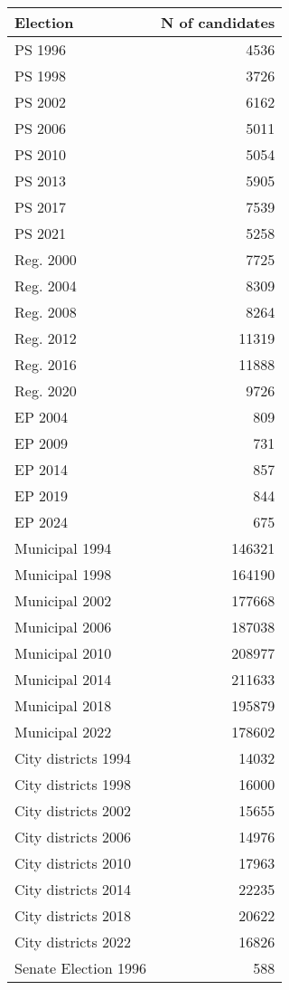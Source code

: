 
\begin{tabular}{l|r}
\hline
Election & N of candidates\\
\hline
PS 1996 & 4536\\
\hline
PS 1998 & 3726\\
\hline
PS 2002 & 6162\\
\hline
PS 2006 & 5011\\
\hline
PS 2010 & 5054\\
\hline
PS 2013 & 5905\\
\hline
PS 2017 & 7539\\
\hline
PS 2021 & 5258\\
\hline
Reg. 2000 & 7725\\
\hline
Reg. 2004 & 8309\\
\hline
Reg. 2008 & 8264\\
\hline
Reg. 2012 & 11319\\
\hline
Reg. 2016 & 11888\\
\hline
Reg. 2020 & 9726\\
\hline
EP 2004 & 809\\
\hline
EP 2009 & 731\\
\hline
EP 2014 & 857\\
\hline
EP 2019 & 844\\
\hline
EP 2024 & 675\\
\hline
Municipal 1994 & 146321\\
\hline
Municipal 1998 & 164190\\
\hline
Municipal 2002 & 177668\\
\hline
Municipal 2006 & 187038\\
\hline
Municipal 2010 & 208977\\
\hline
Municipal 2014 & 211633\\
\hline
Municipal 2018 & 195879\\
\hline
Municipal 2022 & 178602\\
\hline
City districts 1994 & 14032\\
\hline
City districts 1998 & 16000\\
\hline
City districts 2002 & 15655\\
\hline
City districts 2006 & 14976\\
\hline
City districts 2010 & 17963\\
\hline
City districts 2014 & 22235\\
\hline
City districts 2018 & 20622\\
\hline
City districts 2022 & 16826\\
\hline
Senate Election 1996 & 588\\

\end{tabular}

